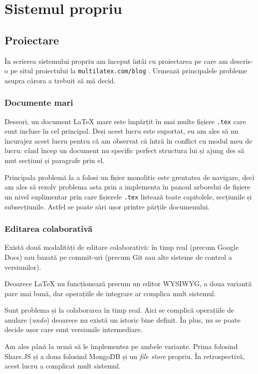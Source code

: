 \documentclass[a4wide,12pt]{report}
\newcommand{\eng}[1]{\emph{#1}} %
\newcommand{\cod}[1]{\texttt{#1}}
\begin{document}
\chapter{Sistemul propriu}

\section{Proiectare}

În scrierea sistemului propriu am început întâi cu proiectarea pe care am
descris-o pe situl proiectului la \cod{multilatex.com/blog} . Urmează
principalele probleme asupra cărora a trebuit să mă decid.

\subsection{Documente mari}

Deseori, un document \LaTeX{} mare este împărțit în mai multe fișiere \cod{.tex}
care sunt incluse în cel principal. Deși acest lucru este suportat, eu am ales
să nu încurajez acest lucru pentru că am observat că întră în conflict cu modul
meu de lucru: când încep un document nu specific perfect structura lui și ajung
des să mut secțiuni și paragrafe prin el.

Principala problemă la a folosi un fișier monolitic este greutatea de navigare,
deci am ales să rezolv problema asta prin a implementa în panoul arborelui de
fișiere un nivel suplimentar prin care fișierele \cod{.tex} listează toate
capitolele, secțiunile și subsecțiunile. Astfel se poate sări ușor printre
părțile documenului.

\subsection{Editarea colaborativă}

Există două modalități de editare colaborativă: în timp real (precum Google
Docs) sau bazată pe commit-uri (precum Git sau alte sisteme de control a
versiunilor).

Deoarece \LaTeX{} nu funcționează precum un editor WYSIWYG, a doua variantă pare
mai bună, dar operațiile de integrare ar complica mult sistemul.

Sunt problema și la colaborarea în timp real. Aici se complică operațiile de
anulare (\eng{undo}) deoarece nu există un istoric bine definit. În plus, nu se
poate decide ușor care sunt versiunile intermediare.

Am ales până la urmă să le împlementez pe ambele variante. Prima folosind
Share.JS și a doua folosind MongoDB și un \eng{file store} propriu. În
retrospectivă, acest lucru a complicat mult sistemul.
\end{document}
